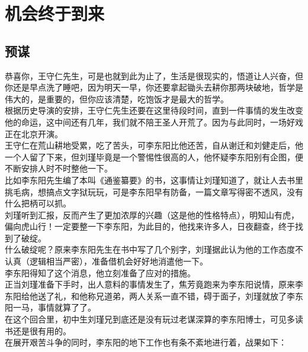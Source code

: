 \section{机会终于到来}
\ifnum{}
	\begin{multicols}{\theparacolNo}
\fi
\subsection{预谋}
恭喜你，王守仁先生，可是也就到此为止了，生活是很现实的，悟道让人兴奋，但你还是早点洗了睡吧，因为明天一早，你还要拿起锄头去耕你那两块破地，哲学是伟大的，是重要的，但你应该清楚，吃饱饭才是最大的哲学。\\

根据历史导演的安排，王守仁先生还要在这里待段时间，直到一件事情的发生改变他的命运，这中间还有几年，我们就不陪王圣人开荒了。因为与此同时，一场好戏正在北京开演。\\

王守仁在荒山耕地受累，吃了苦头，可李东阳比他还苦，自从谢迁和刘健走后，他一个人留了下来，但刘瑾毕竟是一个警惕性很高的人，他怀疑李东阳别有企图，便不断安排人时不时整他一下。\\

比如李东阳先生编了本叫《通鉴纂要》的书，这事情让刘瑾知道了，就让人去书里挑毛病，想搞点文字狱玩玩，可是李东阳早有防备，一篇文章写得密不透风，没有什么把柄可以抓。\\

刘瑾听到汇报，反而产生了更加浓厚的兴趣（这是他的性格特点），明知山有虎，偏向虎山行！一定要整一下李东阳，为此目的，他找来许多人，日夜翻查，终于找到了破绽。\\

什么破绽呢？原来李东阳先生在书中写了几个别字，刘瑾据此认为他的工作态度不认真（逻辑相当严密），准备借机会好好地消遣他一下。\\

李东阳得知了这个消息，他立刻准备了应对的措施。\\

正当刘瑾准备下手时，出人意料的事情发生了，焦芳竟跑来为李东阳说情，原来李东阳给他送了礼，和他称兄道弟，两人关系一直不错，碍于面子，刘瑾就放了李东阳一马，事情就算了了。\\

在这个回合里，初中生刘瑾兄到底还是没有玩过老谋深算的李东阳博士，可见多读书还是很有用的。\\

在展开艰苦斗争的同时，李东阳的地下工作也有条不紊地进行着，战果如下：\\


\end{multicols}
